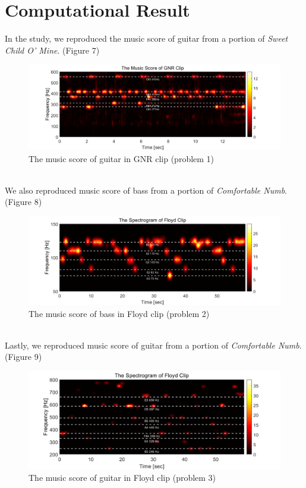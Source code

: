\documentclass{article}
\begin{document}
\newpage
\section{Computational Result}
In the study, we reproduced the music score of guitar from a portion of \textit{Sweet Child O’ Mine}. (Figure 7) \\
\begin{figure}[h]
    \centerline{\includegraphics[width=6in]{music_score_GNR.png}}
    \caption{The music score of guitar in GNR clip (problem 1)}
\end{figure}\\
We also reproduced  music score of bass from a portion of \textit{Comfortable Numb}. (Figure 8) \\
\begin{figure}[h]
    \centerline{\includegraphics[width=6in]{music_score_Floyd_2.png}}
    \caption{The music score of bass in Floyd clip (problem 2)}
\end{figure}\\
Lastly, we reproduced  music score of guitar from a portion of \textit{Comfortable Numb}. (Figure 9)\\
\begin{figure}[h]
    \centerline{\includegraphics[width=6in]{music_score_Floyd_3.png}}
    \caption{The music score of guitar in Floyd clip (problem 3)}
\end{figure}\\
\end{document}
